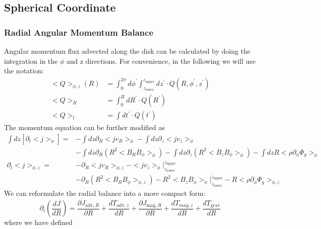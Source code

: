 \documentclass[%
 reprint,
 superscriptaddress,
 amsmath,amssymb,
 nofootinbib,
 prd,
]{revtex4-2}
\newcommand{\hyw}[1]{{\color{red}{[{#1}]}}}
\begin{document}
\subsection{Spherical Coordinate}

\subsubsection{Radial Angular Momentum Balance}


Angular momentum flux advected along the disk can be calculated by doing the integration in the $\phi$ and z directions. For convenience, in the following we will use the notation:
\begin{align*}
\displaystyle < Q >_{\phi ,z}( R) &=\int _{0}^{2\pi } d\phi^\prime \int _{z_{\mathrm{lower}}}^{z_{\mathrm{upper}}} dz^\prime\cdot Q( R,\phi^\prime ,z^\prime) \\
< Q >_{R} &=\int_{0}^{R} dR^\prime\cdot Q(R^\prime) \\
< Q >_{t} &=\int dt^\prime\cdot Q(t^\prime)
\end{align*}
The momentum equation can be further modified as
\begin{align*}
\int dz[ \partial _{t}< j> _{\phi }]  = &-\int dz\partial _{R}< jv_{R}> _{\phi } -\int dz\partial _{z}< jv_{z}> _{\phi } \\
&-\int dz\partial _{R}\left( R^{2}< B_{R} B_{\phi }> _{\phi }\right) -\int dz\partial _{z}\left( R^{2}< B_{z} B_{\phi }> _{\phi }\right) -\int dzR< \rho \partial _{\phi } \Phi _{g}> _{\phi }\\
\partial _{t}< j> _{\phi ,z}  = &-\partial _{R}< jv_{R}> _{\phi ,z} -< jv_{z}> _{\phi } |_{z_{\mathrm{lower}}}^{z_{\mathrm{upper}}} \\
&-\partial _{R}\left( R^{2}< B_{R} B_{\phi }> _{\phi ,z}\right) -R^{2}< B_{z} B_{\phi }> _{\phi } |_{z_{\mathrm{lower}}}^{z_{\mathrm{upper}}} -R< \rho \partial _{\phi } \Phi _{g}> _{\phi ,z}
\end{align*}
We can reformulate the radial balance into a more compact form: 
\begin{equation*}
\partial _{t}\left(\frac{dJ}{dR}\right) =\frac{\partial \dot{J}_{\mathrm{adv} ,R}}{\partial R} +\frac{dT_{\mathrm{adv} ,z}}{dR} +\frac{\partial \dot{J}_{\mathrm{mag} ,R}}{\partial R} +\frac{dT_{mag,z}}{dR} +\frac{dT_{\mathrm{grav}}}{dR}
\end{equation*}
where we have defined 
\end{document}
